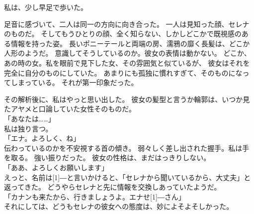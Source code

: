 \documentclass[../IHMain]{subfiles}
\begin{document}
私は、少し早足で歩いた。

足音に感づいて、二人は同一の方向に向き合った。
一人は見知った顔、セレナのものだ。
そしてもうひとりの顔、全く知らない、しかしどこかで既視感のある情報を持った姿。
長いポニーテールと両端の房、濡鴉の靡く長髪は、どこか人形のようだ。
意識してそうしているのか。彼女の表情は動かない。
どこか、あの時の女。私を眼前で見下した女、その雰囲気と似ているが、
彼女はそれを完全に自分のものにしていた。
あまりにも孤独に慣れすぎて、そのものになってしまっている。
それが第一印象だった。

その解析後に、私はやっと思い出した。
彼女の髪型と言うか輪郭は、いつか見たアヤメと口論していた女性そのものだ。\\
「あなたは……」\\
私は独り言つ。\\
「エナ。よろしく、ね」\\
伝わっているのかを不安視する首の傾き。
弱々しく差し出された握手。私は手を取る。
強い振りだった。
彼女の性格は、まだはっきりしない。\\
「ああ、よろしくお願いします」\\
えっと、名前は\scalebox{3}[1]{―}と言いかけると、「セレナから聞いているから、大丈夫」と返ってきた。
どうやらセレナと先に情報を交換しあっていたようだ。\\
「カナンも来たから、行きましょうよ。エナせ\scalebox{3}[1]{―}さん」\\
それにしては、どうもセレナの彼女への態度は、妙によそよそしかった。
\end{document}
